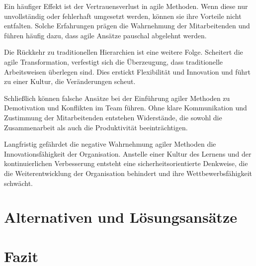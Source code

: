 \documentclass[ngerman]{seminarvorlage}
\begin{document}
Ein häufiger Effekt ist der Vertrauensverlust in agile Methoden. Wenn diese nur unvollständig oder fehlerhaft umgesetzt werden, können sie ihre Vorteile nicht entfalten. Solche Erfahrungen prägen die Wahrnehmung der Mitarbeitenden und führen häufig dazu, dass agile Ansätze pauschal abgelehnt werden.

Die Rückkehr zu traditionellen Hierarchien ist eine weitere Folge. Scheitert die agile Transformation, verfestigt sich die Überzeugung, dass traditionelle Arbeitsweisen überlegen sind. Dies erstickt Flexibilität und Innovation und führt zu einer Kultur, die Veränderungen scheut.

Schließlich können falsche Ansätze bei der Einführung agiler Methoden zu Demotivation und Konflikten im Team führen. Ohne klare Kommunikation und Zustimmung der Mitarbeitenden entstehen Widerstände, die sowohl die Zusammenarbeit als auch die Produktivität beeinträchtigen.

Langfristig gefährdet die negative Wahrnehmung agiler Methoden die Innovationsfähigkeit der Organisation. Anstelle einer Kultur des Lernens und der kontinuierlichen Verbesserung entsteht eine sicherheitsorientierte Denkweise, die die Weiterentwicklung der Organisation behindert und ihre Wettbewerbsfähigkeit schwächt.
\cite{stawicki_10_2021}


\section{Alternativen und Lösungsansätze}

\section{Fazit}


%
%


\end{document}
